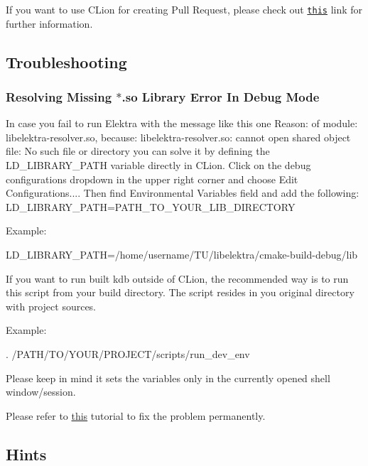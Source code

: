 If you want to use C\+Lion for creating Pull Request, please check out \href{https://www.jetbrains.com/help/clion/contribute-to-projects.html#create-pull-request}{\tt this} link for further information.

\subsection*{Troubleshooting}

\subsubsection*{Resolving Missing $\ast$.so Library Error In Debug Mode}

In case you fail to run Elektra with the message like this one {\ttfamily Reason\+: of module\+: libelektra-\/resolver.\+so, because\+: libelektra-\/resolver.\+so\+: cannot open shared object file\+: No such file or directory} you can solve it by defining the L\+D\+\_\+\+L\+I\+B\+R\+A\+R\+Y\+\_\+\+P\+A\+TH variable directly in C\+Lion. Click on the debug configurations dropdown in the upper right corner and choose \textquotesingle{}Edit Configurations...\textquotesingle{}. Then find \textquotesingle{}Environmental Variables\textquotesingle{} field and add the following\+: L\+D\+\_\+\+L\+I\+B\+R\+A\+R\+Y\+\_\+\+P\+A\+TH=P\+A\+T\+H\+\_\+\+T\+O\+\_\+\+Y\+O\+U\+R\+\_\+\+L\+I\+B\+\_\+\+D\+I\+R\+E\+C\+T\+O\+RY

Example\+:

L\+D\+\_\+\+L\+I\+B\+R\+A\+R\+Y\+\_\+\+P\+A\+TH=/home/username/\+T\+U/libelektra/cmake-\/build-\/debug/lib

If you want to run built {\ttfamily kdb} outside of C\+Lion, the recommended way is to run this script from your build directory. The script resides in you original directory with project sources.

Example\+:


\begin{DoxyCode}
. /PATH/TO/YOUR/PROJECT/scripts/run\_dev\_env
\end{DoxyCode}


Please keep in mind it sets the variables only in the currently opened shell window/session.

Please refer to \hyperlink{doc_COMPILE_md}{this} tutorial to fix the problem permanently.

\subsection*{Hints}


